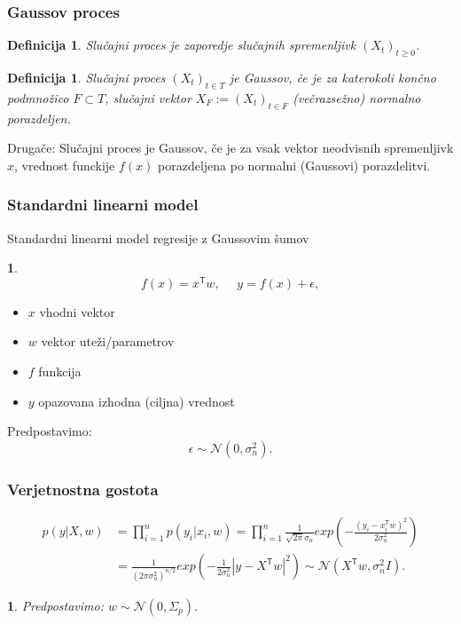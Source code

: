 \documentclass{beamer}
\newtheorem{proposition}[theorem]{Definicija}
\newtheorem{enacba}[theorem]{}
\begin{document}
\begin{frame}

\frametitle{Gaussov proces}

\begin{proposition} 
\alert{Slučajni proces} je zaporedje slučajnih spremenljivk $(X_t)_{t\ge0 } $.
\end{proposition}

\begin{proposition}
Slučajni proces $(X_t)_{t \in T } $ je \alert{Gaussov}, če je za katerokoli končno podmnožico $ F \subset T$, slučajni vektor $ X_F := (X_t)_{t \in F}$ (večrazsežno) normalno porazdeljen. 
\end{proposition}

Drugače: Slučajni proces je Gaussov, če je za vsak vektor neodvisnih spremenljivk $x$, vrednost funckije $f(x)$ porazdeljena po normalni (Gaussovi) porazdelitvi.
\end{frame}


\begin{frame}

\frametitle{Standardni linearni model}

Standardni linearni model regresije z Gaussovim šumov
\begin{enacba}
$$ f(x) = x^\mathsf{T} w, ~~~~~~  y= f(x) + \epsilon, $$
\end{enacba}

\begin{itemize}
\item $x$ vhodni vektor
\item $w$ vektor uteži/parametrov
\item $f$  funkcija
\item $y$ opazovana izhodna (ciljna) vrednost
\end{itemize}

Predpostavimo: $$ \epsilon \sim \mathcal{N}(0, \sigma_{n}^2).$$

\end{frame}


\begin{frame}

\frametitle{Verjetnostna gostota}

\begin{equation} 
\begin{split}
 p( y | X, w) &= \prod\limits_{i=1}^{n} p(y_{i} | x_{i}, w) = \prod\limits_{i=1}^{n} \frac{1}{\sqrt{2\pi} \sigma_{n}} exp(-\frac{ (y_{i}- x_{i}^\mathsf{T} w)^2}{2 \sigma_{n}^2})  \\
 &=\frac{1}{ (2\pi \sigma_{n}^2 )^{n/2}} exp( - \frac{1}{2\sigma_{n}^2}|y - X^\mathsf{T} w |^2)  
 \sim \mathcal{N}( X^\mathsf{T} w, \sigma_{n}^2 I).
\end{split}
\end{equation}


\begin{enacba} 
Predpostavimo: $ w \sim \mathcal{N}(0, \Sigma_{p}).$
\end{enacba}

\end{frame}
\end{document}
